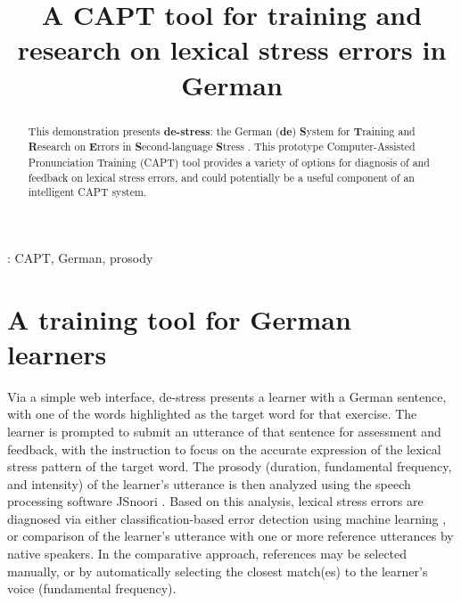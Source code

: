 \documentclass[a4paper]{article}
\title{A CAPT tool for training and research on lexical stress errors in German}
\begin{document}
  \maketitle
  \begin{abstract}
    This demonstration presents \textbf{de-stress}: the German (\textbf{de}) \textbf{S}ystem for \textbf{T}raining and \textbf{R}esearch on \textbf{E}rrors in \textbf{S}econd-language \textbf{S}tress \cite{destress}. 
    This prototype Computer-Assisted Pronunciation Training (CAPT) tool provides a variety of options for diagnosis of and feedback on lexical stress errors, and could potentially be a useful component of an intelligent CAPT system.
  \end{abstract}
  : CAPT, German, prosody


	
%

\section{A training tool for German learners}

 Via a simple web interface, de-stress presents a learner with a German sentence,
 with one of the words highlighted as the target word for that exercise. The learner is prompted to submit an utterance of that sentence for assessment and feedback, with the instruction to focus on the accurate expression of the lexical stress pattern of the target word. The prosody (duration, fundamental frequency, and intensity) of the learner's utterance is then analyzed using the speech processing software JSnoori \cite{jsnoori}. Based on this analysis, lexical stress errors are diagnosed via either classification-based error detection using machine learning \cite{Vakil2015}, or comparison of the learner's utterance with one or more reference utterances by native speakers. In the comparative approach, references may be selected manually, or by automatically selecting the closest match(es) to the learner's voice (fundamental frequency). 
 
\end{document}
